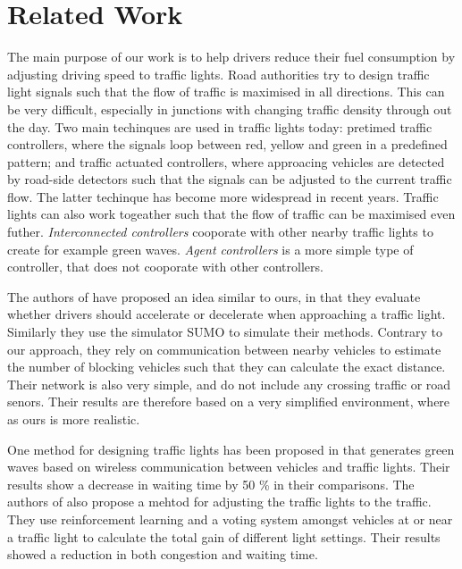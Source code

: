 \section{Related Work}

The main purpose of our work is to help drivers reduce their fuel consumption by adjusting driving speed to traffic lights.
Road authorities try to design traffic light signals such that the flow of traffic is maximised in all directions.
This can be very difficult, especially in junctions with changing traffic density through out the day.
Two main techinques are used in traffic lights today: pretimed traffic controllers, where the signals loop between red, yellow and green in a predefined pattern; and traffic actuated controllers, where approacing vehicles are detected by road-side detectors such that the signals can be adjusted to the current traffic flow.
The latter techinque has become more widespread in recent years. %
Traffic lights can also work togeather such that the flow of traffic can be maximised even futher. 
\textit{Interconnected controllers} cooporate with other nearby traffic lights to create for example green waves.
\textit{Agent controllers} is a more simple type of controller, that does not cooporate with other controllers.

The authors of \cite{VANETsim} have proposed an idea similar to ours, in that they evaluate whether drivers should accelerate or decelerate when approaching a traffic light.
Similarly they use the simulator SUMO to simulate their methods. 
Contrary to our approach, they rely on communication between nearby vehicles to estimate the number of blocking vehicles such that they can calculate the exact distance.
Their network is also very simple, and do not include any crossing traffic or road senors. 
Their results are therefore based on a very simplified environment, where as ours is more realistic.

One method for designing traffic lights has been proposed in \cite{SOTL} that generates green waves based on wireless communication between vehicles and traffic lights. Their results show a decrease in waiting time by 50 \% in their comparisons.
The authors of \cite{ITLC} also propose a mehtod for adjusting the traffic lights to the traffic. They use reinforcement learning and a voting system amongst vehicles at or near a traffic light to calculate the total gain of different light settings. Their results showed a reduction in both congestion and waiting time.



